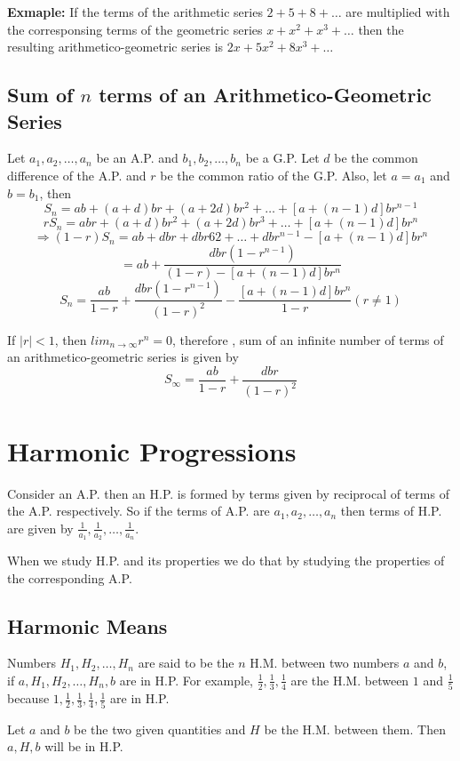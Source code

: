 \textbf{Exmaple:} If the terms of the arithmetic series $2 + 5 + 8 + \ldots$ are multiplied with the corresponsing terms of the
geometric series $x + x^2 + x^3 + \ldots$ then the resulting arithmetico-geometric series is $2x + 5x^2 + 8x^3 + \ldots$

\subsection{Sum of $n$ terms of an Arithmetico-Geometric Series}
Let $a_1, a_2, \ldots, a_n$ be an A.P. and $b_1, b_2, \ldots, b_n$ be a G.P. Let $d$ be the common difference of the A.P. and $r$
be the common ratio of the G.P. Also, let $a = a_1$ and $b = b_1$, then
$$S_n = ab + (a + d)br + (a+ 2d)br^2 + \ldots + [a + (n - 1)d]br^{n - 1}$$
$$rS_n = abr + (a + d)br^2 + (a + 2d)br^3 + \ldots + [a + (n - 1)d]br^n$$
$$\Rightarrow (1 - r)S_n = ab + dbr + dbr62 + \ldots + dbr^{n - 1} - [a + (n - 1)d]br^n$$
$$= ab + \frac{dbr(1 - r^{n - 1})}{(1 - r) - [a + (n - 1)d]br^n}$$
$$S_n = \frac{ab}{1 - r} + \frac{dbr(1 - r^{n - 1})}{(1 - r)^2} - \frac{[a + (n - 1)d]br^n}{1 - r}(r\neq 1)$$

If $|r|< 1$, then $lim_{n\to \infty}r^n = 0$, therefore , sum of an infinite number of terms of an arithmetico-geometric series is
given by
$$S_\infty = \frac{ab}{1 - r} + \frac{dbr}{(1 - r)^2}$$

\section{Harmonic Progressions}
Consider an A.P. then an H.P. is formed by terms given by reciprocal of terms of the A.P. respectively. So if the terms of A.P. are
$a_1, a_2, \ldots, a_n$ then terms of H.P. are given by $\frac{1}{a_1}, \frac{1}{a_2}, \ldots, \frac{1}{a_n}$.

When we study H.P. and its properties we do that by studying the properties of the corresponding A.P.

\subsection{Harmonic Means}
Numbers $H_1, H_2, \ldots, H_n$ are said to be the $n$ H.M. between two numbers $a$ and $b$, if $a, H_1, H_2, \ldots, H_n, b$ are
in H.P. For example, $\frac{1}{2}, \frac{1}{3}, \frac{1}{4}$ are the H.M. between $1$ and $\frac{1}{5}$ because $1, \frac{1}{2},
\frac{1}{3}, \frac{1}{4}, \frac{1}{5}$ are in H.P.

Let $a$ and $b$ be the two given quantities and $H$ be the H.M. between them. Then $a, H, b$ will be in H.P.

